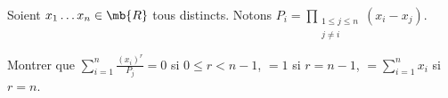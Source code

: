 
Soient $x_1 \dots x_n \in \mb{R}$ tous distincts. Notons $\displaystyle P_i =  \prod_{\substack{1 \le j \le n \\ j \neq i}} (x_i - x_j)$.

Montrer que $\displaystyle \sum_{i=1}^n \frac{(x_i)^r}{P_j} = 0$ si $0 \le r < n-1$,  $=1$ si $r = n-1$, $=\displaystyle \sum_{i=1}^n x_i$ si $r = n$.















